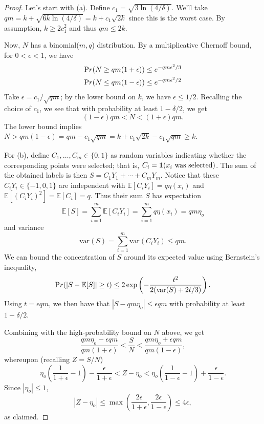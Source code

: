 \documentclass[anon,12pt]{colt2022} %
\def\pr{{\textrm Pr}}
\def\E{{\mathbb E}}
\begin{document}
\begin{proof}
Let's start with (a). Define $c_1 = \sqrt{3 \ln (4/\delta)}$. We'll take $qm = k + \sqrt{6k \ln (4/\delta)} = k + c_1 \sqrt{2k}$ since this is the worst case. By assumption, $k \geq 2c_1^2$ and thus $qm \leq 2k$.

Now, $N$ has a binomial($m,q$) distribution. By a multiplicative Chernoff bound, for $0 < \epsilon < 1$, we have
\begin{align*}
\pr(N \geq qm(1+\epsilon)) &\leq e^{-qm\epsilon^2/3} \\
\pr(N \leq qm(1-\epsilon)) &\leq e^{-qm\epsilon^2/2}
\end{align*}
Take $\epsilon = c_1/\sqrt{qm}$; by the lower bound on $k$, we have $\epsilon \leq 1/2$. Recalling the choice of $c_1$, we see that with probability at least $1-\delta/2$, we get 
$$(1-\epsilon) qm < N < (1+\epsilon) qm .$$
The lower bound implies $N > qm(1-\epsilon) = qm - c_1\sqrt{qm} = k + c_1 \sqrt{2k} - c_1 \sqrt{qm} \geq k$.

For (b), define $C_1, \ldots, C_m \in \{0,1\}$ as random variables indicating whether the corresponding points were selected; that is, $C_i = {\bf 1}(\mbox{$x_i$ was selected})$. The sum of the obtained labels is then $S = C_1 Y_1 + \cdots + C_m Y_m$. Notice that these $C_iY_i \in \{-1,0,1\}$ are independent with $\E[C_iY_i] = q \eta(x_i)$ and $\E[(C_iY_i)^2] = \E[C_i] = q$. Thus their sum $S$ has expectation
$$ \E [S] = \sum_{i=1}^m \E[C_i Y_i] = \sum_{i=1}^m q \eta(x_i) = qm \eta_o $$
and variance
$$ \mbox{var}(S) = \sum_{i=1}^m \mbox{var}(C_iY_i) \leq qm .$$
We can bound the concentration of $S$ around its expected value using Bernstein's inequality,
$$ \pr(|S - \E[S]| \geq t) \leq 2 \exp \left( - \frac{t^2}{2(\mbox{var}(S) + 2t/3)} \right) .$$
Using $t = \epsilon qm$, we then have that $|S - qm \eta_o| \leq \epsilon qm$ with probability at least $1-\delta/2$.

Combining with the high-probability bound on $N$ above, we get
$$ \frac{qm \eta_o - \epsilon qm}{qm(1+\epsilon)} < \frac{S}{N} < \frac{qm \eta_o + \epsilon qm}{qm(1-\epsilon)},$$
whereupon (recalling $Z = S/N$)
$$ 
\eta_o \left( \frac{1}{1+\epsilon} -1 \right) - \frac{\epsilon}{1+\epsilon} < Z - \eta_o < \eta_o \left( \frac{1}{1-\epsilon} - 1 \right) + \frac{\epsilon}{1-\epsilon} .$$
Since $|\eta_o| \leq 1$,
$$ |Z - \eta_o | \leq \max \left( \frac{2\epsilon}{1+\epsilon}, \frac{2\epsilon}{1-\epsilon} \right)
\leq 
4 \epsilon,$$
as claimed.  
\end{proof}
\end{document}
